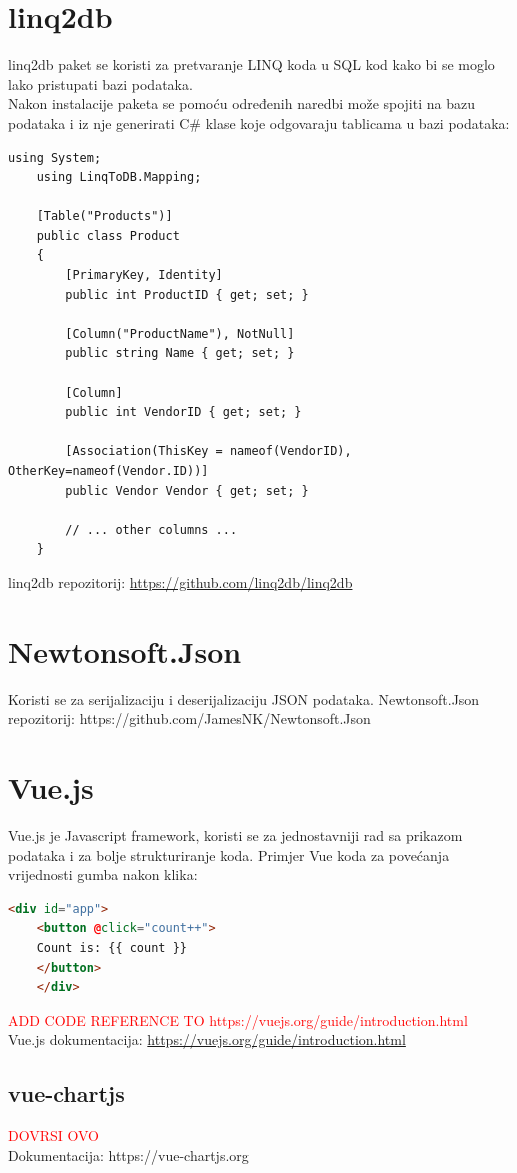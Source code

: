 \documentclass[zavrsnirad]{fer}
\begin{document}
\section{linq2db}
\label{pog:linq2db}
linq2db paket se koristi za pretvaranje LINQ koda u SQL kod kako bi se moglo lako pristupati bazi podataka.
\\Nakon instalacije paketa se pomoću određenih naredbi može spojiti na bazu podataka i iz nje generirati C\# klase koje odgovaraju tablicama u bazi podataka:
\begin{lstlisting}[language=CSharp]
	using System;
	using LinqToDB.Mapping;
	
	[Table("Products")]
	public class Product
	{
		[PrimaryKey, Identity]
		public int ProductID { get; set; }
		
		[Column("ProductName"), NotNull]
		public string Name { get; set; }
		
		[Column]
		public int VendorID { get; set; }
		
		[Association(ThisKey = nameof(VendorID), OtherKey=nameof(Vendor.ID))]
		public Vendor Vendor { get; set; }
		
		// ... other columns ...
	}
\end{lstlisting}
linq2db repozitorij: \url{https://github.com/linq2db/linq2db}

\section{Newtonsoft.Json}
Koristi se za serijalizaciju i deserijalizaciju JSON podataka.
Newtonsoft.Json repozitorij: https://github.com/JamesNK/Newtonsoft.Json

\section{Vue.js}
\label{pog:vue}
Vue.js je Javascript framework, koristi se za jednostavniji rad sa prikazom podataka i za bolje strukturiranje koda.
Primjer Vue koda za povećanja vrijednosti gumba nakon klika:
\begin{lstlisting}[language=html]
	<div id="app">
	<button @click="count++">
	Count is: {{ count }}
	</button>
	</div>
\end{lstlisting}
\textcolor{red}{ADD CODE REFERENCE TO https://vuejs.org/guide/introduction.html}
\\Vue.js dokumentacija: \url{https://vuejs.org/guide/introduction.html}

\subsection{vue-chartjs}
\label{pog:chart.vue}
\textcolor{red}{DOVRSI OVO}
\\Dokumentacija: https://vue-chartjs.org
\end{document}
